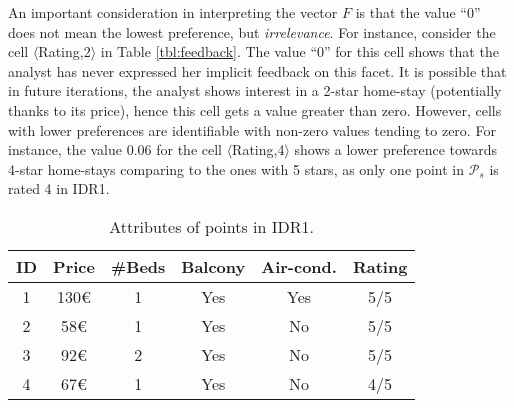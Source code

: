 \vspace{2pt}
An important consideration in interpreting the vector $F$ is that the value ``0'' does not mean the lowest preference, but {\em irrelevance}. For instance, consider the cell $\langle$Rating,2$\rangle$ in Table \ref{tbl:feedback}. The value ``0'' for this cell shows that the analyst has never expressed her implicit feedback on this facet. It is possible that in future iterations, the analyst shows interest in a 2-star home-stay (potentially thanks to its price), hence this cell gets a value greater than zero. However, cells with lower preferences are identifiable with non-zero values tending to zero. For instance, the value 0.06 for the cell $\langle$Rating,4$\rangle$ shows a lower preference towards 4-star home-stays comparing to the ones with 5 stars, as only one point in $\mathcal{P}_s$ is rated 4 in IDR1.

\begin{table}[t]
\centering
\caption{Attributes of points in IDR1.}
\label{tbl:attribs}
\begin{tabular}{|c|c|c|c|c|c|}
\hline
\textbf{ID} & \textbf{Price} & \textbf{\#Beds} & \textbf{Balcony} & \textbf{Air-cond.} & \textbf{Rating} \\ \hline
1                     & 130\euro           & 1               & Yes           & Yes                & 5/5             \\ \hline
2                     & 58\euro            & 1               & Yes           & No                 & 5/5             \\ \hline
3                     & 92\euro            & 2               & Yes           & No                 & 5/5             \\ \hline
4                     & 67\euro            & 1               & Yes           & No                 & 4/5             \\ \hline
\end{tabular}
\end{table}


